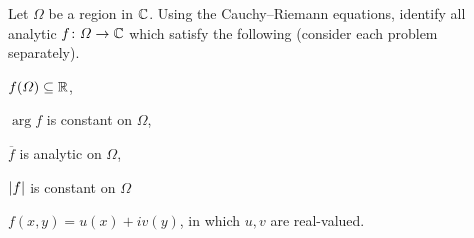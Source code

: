 \documentclass{../math135}
\begin{document}
\begin{exercise}
	Let \(\Omega\) be a region in \(\mathbb C\).  Using the Cauchy--Riemann
  equations, identify all analytic \(f \colon \Omega\to\mathbb C\) which satisfy
  the following (consider each problem separately).
	\begin{problems}
  \item \(f(\Omega) \subseteq \mathbb R\),

    \begin{solution}
    \end{solution}

  \item \(\arg f\) is constant on \(\Omega\),

    \begin{solution}
    \end{solution}

  \item \(\overline{f}\) is analytic on \(\Omega\),

    \begin{solution}
    \end{solution}

  \item \(\lvert f\rvert\) is constant on \(\Omega\)

    \begin{solution}
    \end{solution}

  \item \(f(x,y) = u(x) + i v(y)\), in which \(u,v\) are real-valued.

    \begin{solution}
    \end{solution}

	\end{problems}
\end{exercise}
\end{document}
